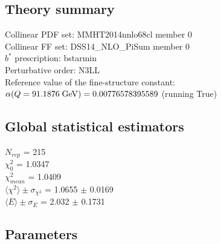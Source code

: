 \documentclass[
]{article}
\begin{document}
\hypertarget{theory-summary}{%
\subsection{Theory summary}\label{theory-summary}}

Collinear PDF set: MMHT2014nnlo68cl member 0\\
Collinear FF set: DSS14\_NLO\_PiSum member 0\\
\(b^*\) prescription: bstarmin\\
Perturbative order: N3LL\\
Reference value of the fine-structure constant:
\(\alpha(Q = 91.1876\;{\rm GeV}) = 0.00776578395589\) (running True)

\hypertarget{global-statistical-estimators}{%
\subsection{Global statistical
estimators}\label{global-statistical-estimators}}

\(N_{rep}\) = 215\\
\(\chi_{0}^2\) = 1.0347\\
\(\chi_{mean}^2\) = 1.0409\\
\(\langle\chi^2\rangle \pm \sigma_{\chi^2}\) = 1.0655 \(\pm\) 0.0169\\
\(\langle E \rangle \pm \sigma_{E}\) = 2.032 \(\pm\) 0.1731

\hypertarget{parameters}{%
\subsection{Parameters}\label{parameters}}
\end{document}
